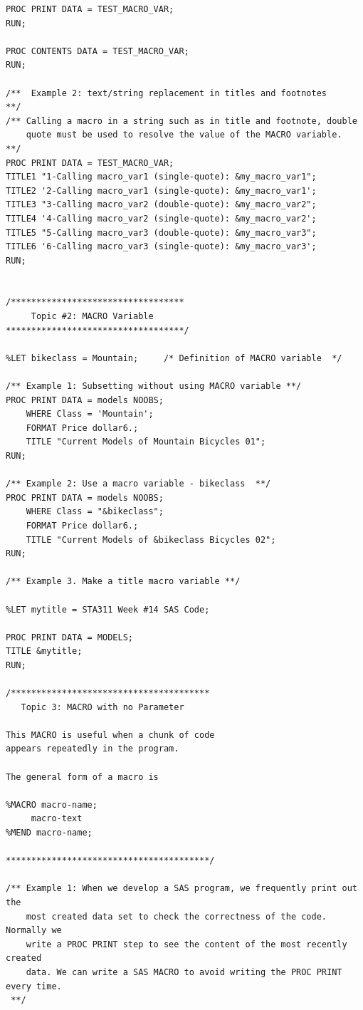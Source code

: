 \documentclass[
]{book}
\begin{document}
\begin{verbatim}
PROC PRINT DATA = TEST_MACRO_VAR;
RUN;

PROC CONTENTS DATA = TEST_MACRO_VAR;
RUN;

/**  Example 2: text/string replacement in titles and footnotes     **/
/** Calling a macro in a string such as in title and footnote, double 
    quote must be used to resolve the value of the MACRO variable.  **/
PROC PRINT DATA = TEST_MACRO_VAR;
TITLE1 "1-Calling macro_var1 (single-quote): &my_macro_var1";
TITLE2 '2-Calling macro_var1 (single-quote): &my_macro_var1';
TITLE3 "3-Calling macro_var2 (double-quote): &my_macro_var2";
TITLE4 '4-Calling macro_var2 (single-quote): &my_macro_var2';
TITLE5 "5-Calling macro_var3 (double-quote): &my_macro_var3";
TITLE6 '6-Calling macro_var3 (single-quote): &my_macro_var3';
RUN;


/**********************************
     Topic #2: MACRO Variable
***********************************/

%LET bikeclass = Mountain;     /* Definition of MACRO variable  */

/** Example 1: Subsetting without using MACRO variable **/
PROC PRINT DATA = models NOOBS;
    WHERE Class = 'Mountain';
    FORMAT Price dollar6.;
    TITLE "Current Models of Mountain Bicycles 01";
RUN;

/** Example 2: Use a macro variable - bikeclass  **/
PROC PRINT DATA = models NOOBS;
    WHERE Class = "&bikeclass";
    FORMAT Price dollar6.;
    TITLE "Current Models of &bikeclass Bicycles 02";
RUN;

/** Example 3. Make a title macro variable **/

%LET mytitle = STA311 Week #14 SAS Code;

PROC PRINT DATA = MODELS;
TITLE &mytitle;
RUN;

/***************************************
   Topic 3: MACRO with no Parameter

This MACRO is useful when a chunk of code 
appears repeatedly in the program.

The general form of a macro is

%MACRO macro-name;
     macro-text
%MEND macro-name;

****************************************/

/** Example 1: When we develop a SAS program, we frequently print out the
    most created data set to check the correctness of the code. Normally we
    write a PROC PRINT step to see the content of the most recently created
    data. We can write a SAS MACRO to avoid writing the PROC PRINT every time.
 **/


\end{verbatim}
\end{document}
